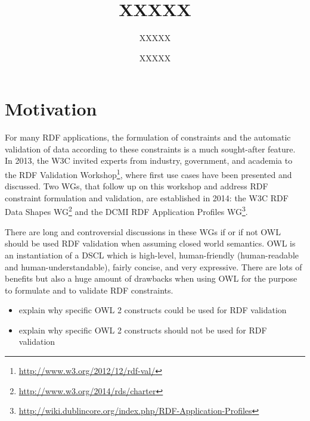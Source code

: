 \documentclass{llncs}
\begin{document}
%
%
\title{XXXXX}
%
%
\author{XXXXX \and XXXXX}
%
%

\maketitle              %

\begin{abstract}


\end{abstract}
%

\section{Motivation}

For many RDF applications, the formulation of constraints and the automatic validation of data according to these constraints is a much sought-after feature. 
In 2013, the W3C invited experts from industry, government, and academia to the RDF Validation Workshop\footnote{\url{http://www.w3.org/2012/12/rdf-val/}}, 
where first use cases have been presented and discussed. 
Two WGs, that follow up on this workshop and address RDF constraint formulation and validation, are established in 2014: 
the W3C RDF Data Shapes WG\footnote{\url{http://www.w3.org/2014/rds/charter}} and the DCMI RDF Application Profiles WG\footnote{\url{http://wiki.dublincore.org/index.php/RDF-Application-Profiles}}. 

There are long and controversial discussions in these WGs if or if not OWL should be used RDF validation when assuming closed world semantics.
OWL is an instantiation of a DSCL which is high-level, human-friendly (human-readable and human-understandable), fairly concise, and very expressive.
There are lots of benefits but also a huge amount of drawbacks when using OWL for the purpose to formulate and to validate RDF constraints.

\begin{itemize}
	\item explain why specific OWL 2 constructs could be used for RDF validation 
	\item explain why specific OWL 2 constructs should not be used for RDF validation
\end{itemize}
\end{document}
